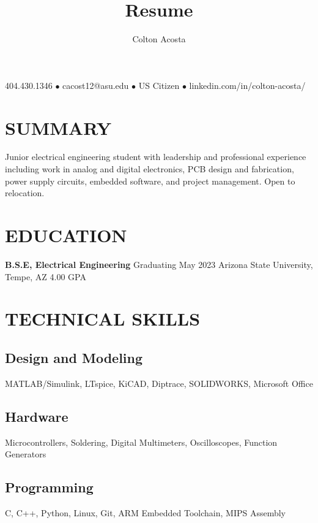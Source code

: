 \documentclass{article}
\makeatletter
\renewcommand{\maketitle}{
	\begin{center}
		{\huge\bfseries
			\theauthor}
			
		404.430.1346 $\bullet$ cacost12@asu.edu $\bullet$ US Citizen $\bullet$ linkedin.com/in/colton-acosta/
	\end{center}
}
\makeatother
\begin{document}
\title{Resume}
\author{Colton Acosta}
\maketitle
\section{SUMMARY}
Junior electrical engineering student with leadership and professional experience including work in analog and digital electronics, PCB design and fabrication, power supply circuits, embedded software, and project management. Open to relocation.

\section{EDUCATION}
\textbf{B.S.E, Electrical Engineering}
\hfill 
Graduating May 2023
\linebreak
Arizona State University, Tempe, AZ 
\hfill
4.00 GPA

\section{TECHNICAL SKILLS}
\subsection{Design and Modeling}
MATLAB/Simulink, LTspice, KiCAD, Diptrace, SOLIDWORKS, Microsoft Office
\subsection{Hardware}
Microcontrollers, Soldering, Digital Multimeters, Oscilloscopes, Function Generators
\subsection{Programming} 
C, C++, Python, Linux, Git, ARM Embedded Toolchain, MIPS Assembly
\end{document}
